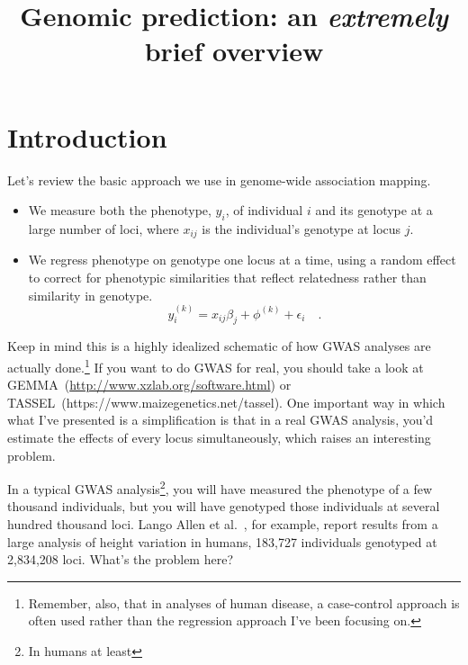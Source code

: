 \documentclass[12pt]{article}
\title{Genomic prediction: an {\it extremely\/} brief overview}
\begin{document}
\maketitle

\thispagestyle{first}

\section*{Introduction}

Let's review the basic approach we use in genome-wide association
mapping.

\begin{itemize}

\item We measure both the phenotype, $y_i$, of individual $i$ and its
  genotype at a large number of loci, where $x_{ij}$ is the
  individual's genotype at locus $j$.

\item We regress phenotype on genotype one locus at a time, using a
  random effect to correct for phenotypic similarities that reflect
  relatedness rather than similarity in genotype. 
\[
y_i^{(k)} = x_{ij}\beta_j + \phi^{(k)} + \epsilon_i \quad .
\]

\end{itemize}

Keep in mind this is a highly idealized schematic of how GWAS analyses
are actually done.\footnote{Remember, also, that in analyses of human
  disease, a case-control approach is often used rather than the
  regression approach I've been focusing on.} If you want to do GWAS
for real, you should take a look at
GEMMA~(\url{http://www.xzlab.org/software.html}) or
TASSEL~(https://www.maizegenetics.net/tassel). One
important way in which what I've presented is a simplification is that
in a real GWAS analysis, you'd estimate the effects of every locus
simultaneously, which raises an interesting problem.

In a typical GWAS analysis\footnote{In humans at least}, you will have
measured the phenotype of a few thousand individuals, but you will
have genotyped those individuals at several hundred thousand
loci. Lango Allen et al.~\cite{LangoAllen-etal-2010}, for example,
report results from a large analysis of height variation in humans,
183,727 individuals genotyped at 2,834,208 loci. What's the problem
here?
\end{document}
